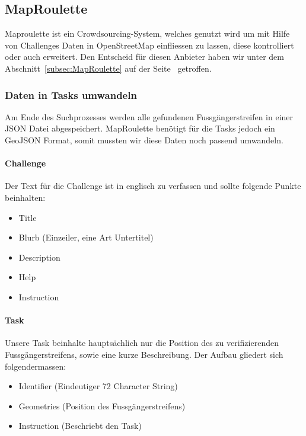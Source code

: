 \subsection{MapRoulette}
Maproulette ist ein Crowdsourcing-System, welches genutzt wird um mit Hilfe von Challenges Daten in OpenStreetMap einfliessen zu lassen, diese kontrolliert oder auch erweitert. Den Entscheid für diesen Anbieter haben wir unter dem Abschnitt~\ref{subsec:MapRoulette} auf der Seite~\pageref{subsec:MapRoulette} getroffen.

\subsubsection{Daten in Tasks umwandeln}
Am Ende des Suchprozesses werden alle gefundenen Fussgängerstreifen in einer JSON Datei abgespeichert. MapRoulette benötigt für die Tasks jedoch ein GeoJSON Format, somit mussten wir diese Daten noch passend umwandeln. 

\paragraph{Challenge} Der Text für die Challenge ist in englisch zu verfassen und sollte folgende Punkte beinhalten:
\begin{itemize}
	\item Title
	\item Blurb (Einzeiler, eine Art Untertitel)
	\item Description
	\item Help
	\item Instruction
\end{itemize}

\paragraph{Task} Unsere Task beinhalte hauptsächlich nur die Position des zu verifizierenden Fussgängerstreifens, sowie eine kurze Beschreibung. Der Aufbau gliedert sich folgendermassen:
\begin{itemize}
	\item Identifier (Eindeutiger 72 Character String)
	\item Geometries (Position des Fussgängerstreifens)
	\item Instruction (Beschriebt den Task)
\end{itemize}